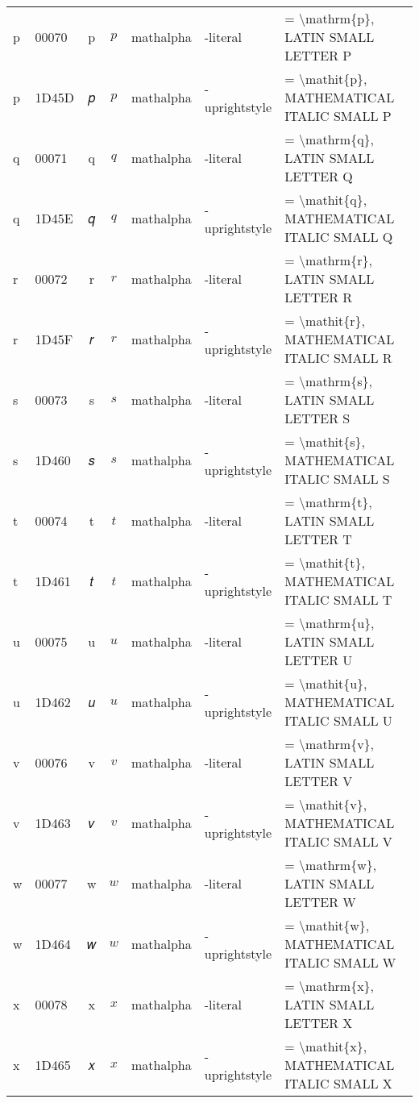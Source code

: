 \documentclass[a4paper,landscape]{article}
\begin{document}
\begin{longtable}{llcclll}
p & 00070 & p & $p$ & mathalpha & -literal & = \textbackslash{}mathrm\{p\}, LATIN SMALL LETTER P \\
p & 1D45D & 𝑝 & $p$ & mathalpha & -uprightstyle & = \textbackslash{}mathit\{p\}, MATHEMATICAL ITALIC SMALL P \\
q & 00071 & q & $q$ & mathalpha & -literal & = \textbackslash{}mathrm\{q\}, LATIN SMALL LETTER Q \\
q & 1D45E & 𝑞 & $q$ & mathalpha & -uprightstyle & = \textbackslash{}mathit\{q\}, MATHEMATICAL ITALIC SMALL Q \\
r & 00072 & r & $r$ & mathalpha & -literal & = \textbackslash{}mathrm\{r\}, LATIN SMALL LETTER R \\
r & 1D45F & 𝑟 & $r$ & mathalpha & -uprightstyle & = \textbackslash{}mathit\{r\}, MATHEMATICAL ITALIC SMALL R \\
s & 00073 & s & $s$ & mathalpha & -literal & = \textbackslash{}mathrm\{s\}, LATIN SMALL LETTER S \\
s & 1D460 & 𝑠 & $s$ & mathalpha & -uprightstyle & = \textbackslash{}mathit\{s\}, MATHEMATICAL ITALIC SMALL S \\
t & 00074 & t & $t$ & mathalpha & -literal & = \textbackslash{}mathrm\{t\}, LATIN SMALL LETTER T \\
t & 1D461 & 𝑡 & $t$ & mathalpha & -uprightstyle & = \textbackslash{}mathit\{t\}, MATHEMATICAL ITALIC SMALL T \\
u & 00075 & u & $u$ & mathalpha & -literal & = \textbackslash{}mathrm\{u\}, LATIN SMALL LETTER U \\
u & 1D462 & 𝑢 & $u$ & mathalpha & -uprightstyle & = \textbackslash{}mathit\{u\}, MATHEMATICAL ITALIC SMALL U \\
v & 00076 & v & $v$ & mathalpha & -literal & = \textbackslash{}mathrm\{v\}, LATIN SMALL LETTER V \\
v & 1D463 & 𝑣 & $v$ & mathalpha & -uprightstyle & = \textbackslash{}mathit\{v\}, MATHEMATICAL ITALIC SMALL V \\
w & 00077 & w & $w$ & mathalpha & -literal & = \textbackslash{}mathrm\{w\}, LATIN SMALL LETTER W \\
w & 1D464 & 𝑤 & $w$ & mathalpha & -uprightstyle & = \textbackslash{}mathit\{w\}, MATHEMATICAL ITALIC SMALL W \\
x & 00078 & x & $x$ & mathalpha & -literal & = \textbackslash{}mathrm\{x\}, LATIN SMALL LETTER X \\
x & 1D465 & 𝑥 & $x$ & mathalpha & -uprightstyle & = \textbackslash{}mathit\{x\}, MATHEMATICAL ITALIC SMALL X \\

\end{longtable}
\end{document}

